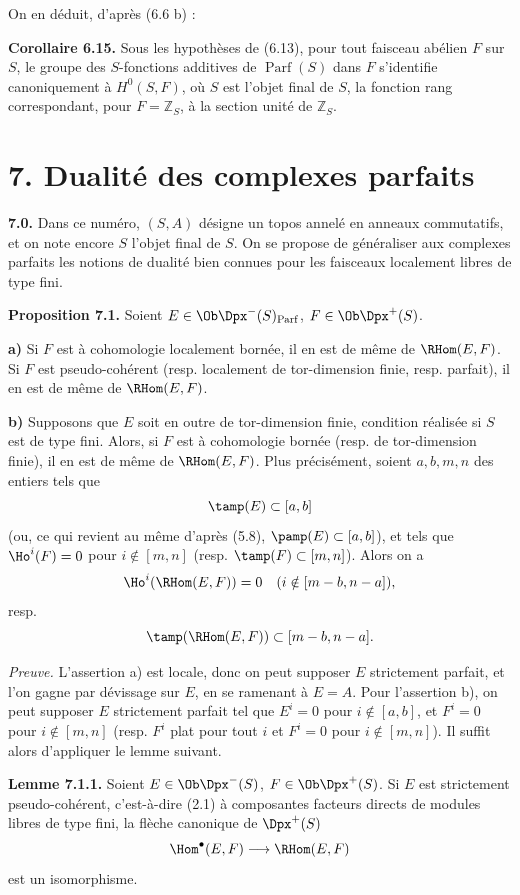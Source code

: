 \documentclass[11pt]{article}
\newcommand{\Parf}{\operatorname{Parf}}
\begin{document}
On en déduit, d'après (6.6 b) :

\textbf{Corollaire 6.15.} Sous les hypothèses de (6.13), pour tout faisceau abélien \(F\) sur \(S\), le groupe des \(S\)-fonctions additives de \(\Parf(S)\) dans \(F\) s'identifie canoniquement à \(H^0(S,F)\), où \(S\) est l'objet final de \(S\), la fonction rang correspondant, pour \(F=\mathbb Z_S\), à la section unité de \(\mathbb Z_S\).

\section*{7. Dualité des complexes parfaits}

\textbf{7.0.} Dans ce numéro, \((S,A)\) désigne un topos annelé en anneaux commutatifs, et on note encore \(S\) l'objet final de \(S\). On se propose de généraliser aux complexes parfaits les notions de dualité bien connues pour les faisceaux localement libres de type fini.

\textbf{Proposition 7.1.} Soient \(E\in\Ob\Dpx^-(S)_{\Parf}\), \(F\in\Ob\Dpx^+(S)\).

\textbf{a)} Si \(F\) est à cohomologie localement bornée, il en est de même de \(\RHom(E,F)\). Si \(F\) est pseudo-cohérent (resp. localement de tor-dimension finie, resp. parfait), il en est de même de \(\RHom(E,F)\).

\textbf{b)} Supposons que \(E\) soit en outre de tor-dimension finie, condition réalisée si \(S\) est de type fini. Alors, si \(F\) est à cohomologie bornée (resp. de tor-dimension finie), il en est de même de \(\RHom(E,F)\). Plus précisément, soient \(a,b,m,n\) des entiers tels que
\[
  \tamp(E)\subset[a,b]
\]
(ou, ce qui revient au même d'après (5.8), \(\pamp(E)\subset[a,b]\)), et tels que \(\Ho^i(F)=0\) pour \(i\notin[m,n]\) (resp. \(\tamp(F)\subset[m,n]\)). Alors on a
\[
  \Ho^i(\RHom(E,F))=0\quad(i\notin[m-b,n-a]),
\]
resp.
\[
  \tamp(\RHom(E,F))\subset[m-b,n-a].
\]

\emph{Preuve.} L'assertion a) est locale, donc on peut supposer \(E\) strictement parfait, et l'on gagne par dévissage sur \(E\), en se ramenant à \(E=A\). Pour l'assertion b), on peut supposer \(E\) strictement parfait tel que \(E^i=0\) pour \(i\notin[a,b]\), et \(F^i=0\) pour \(i\notin[m,n]\) (resp. \(F^i\) plat pour tout \(i\) et \(F^i=0\) pour \(i\notin[m,n]\)). Il suffit alors d'appliquer le lemme suivant.

\textbf{Lemme 7.1.1.} Soient \(E\in\Ob\Dpx^-(S)\), \(F\in\Ob\Dpx^+(S)\). Si \(E\) est strictement pseudo-cohérent, c'est-à-dire (2.1) à composantes facteurs directs de modules libres de type fini, la flèche canonique de \(\Dpx^+(S)\)
\[
  \Hom^\bullet(E,F)\longrightarrow\RHom(E,F)
\]
est un isomorphisme.
\end{document}
